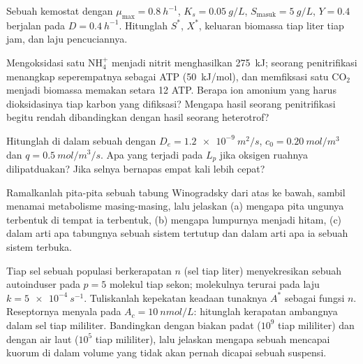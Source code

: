\begin{exercise}[$\star\star$]\label{exo:b2:microbial-metabolism:7}
Sebuah kemostat dengan $\mu_{\max} = \qty{0.8}{h^{-1}}$, $K_s =
\qty{0.05}{g/L}$, $S_{\text{masuk}} = \qty{5}{g/L}$, $Y = 0.4$ berjalan pada
$D = \qty{0.4}{h^{-1}}$. Hitunglah $S^*$, $X^*$, keluaran biomassa
tiap liter tiap jam, dan laju pencuciannya.
\end{exercise}

\begin{exercise}[$\star\star$]\label{exo:b2:microbial-metabolism:8}
Mengoksidasi satu $\mathrm{NH_4^+}$ menjadi nitrit menghasilkan
\qty{275}{kJ}; seorang penitrifikasi menangkap seperempatnya sebagai
ATP (\qty{50}{kJ/mol}), dan memfiksasi satu $\mathrm{CO_2}$ menjadi
biomassa memakan setara 12 ATP. Berapa ion amonium yang harus
dioksidasinya tiap karbon yang difiksasi? Mengapa hasil seorang
penitrifikasi begitu rendah dibandingkan dengan hasil seorang heterotrof?
\end{exercise}

\begin{exercise}[$\star\star$]\label{exo:b2:microbial-metabolism:9}
Hitunglah  di dalam sebuah  dengan $D_e =
\qty{1.2e-9}{m^2/s}$, $c_0 = \qty{0.20}{mol/m^3}$ dan $q =
\qty{0.5}{mol/m^3/s}$. Apa yang terjadi pada $L_p$ jika oksigen ruahnya
dilipatduakan? Jika selnya bernapas empat kali lebih cepat?
\end{exercise}

\begin{exercise}[$\star\star\star$]\label{exo:b2:microbial-metabolism:10}
Ramalkanlah pita-pita sebuah tabung Winogradsky dari atas ke bawah,
sambil menamai metabolisme masing-masing, lalu jelaskan (a) mengapa pita
ungunya terbentuk di tempat ia terbentuk, (b) mengapa lumpurnya menjadi
hitam, (c) dalam arti apa tabungnya sebuah sistem tertutup dan dalam
arti apa ia sebuah sistem terbuka.
\end{exercise}

\begin{exercise}[$\star\star\star$]\label{exo:b2:microbial-metabolism:11}
Tiap sel sebuah populasi berkerapatan $n$ (sel tiap liter) menyekresikan
sebuah autoinduser pada $p = 5$ molekul tiap sekon; molekulnya
terurai pada laju $k = \qty{5e-4}{s^{-1}}$. Tuliskanlah kepekatan
keadaan tunaknya $A^*$ sebagai fungsi $n$. Reseptornya menyala pada
$A_c = \qty{10}{nmol/L}$: hitunglah kerapatan ambangnya dalam sel tiap
mililiter. Bandingkan dengan biakan padat ($10^{9}$ tiap mililiter) dan
dengan air laut ($10^{5}$ tiap mililiter), lalu jelaskan mengapa sebuah
 mencapai kuorum di dalam volume yang tidak akan pernah dicapai
sebuah suspensi.
\end{exercise}

